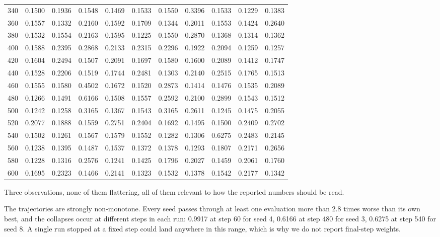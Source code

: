 \begin{table}[htbp]
\begin{tabular}{@{}lcccccccccc@{}}
340 & 0.1500 & 0.1936 & 0.1548 & 0.1469 & 0.1533 & 0.1550 & 0.3396 & 0.1533 & 0.1229 & 0.1383 \\
360 & 0.1557 & 0.1332 & 0.2160 & 0.1592 & 0.1709 & 0.1344 & 0.2011 & 0.1553 & 0.1424 & 0.2640 \\
380 & 0.1532 & 0.1554 & 0.2163 & 0.1595 & 0.1225 & 0.1550 & 0.2870 & 0.1368 & 0.1314 & 0.1362 \\
400 & 0.1588 & 0.2395 & 0.2868 & 0.2133 & 0.2315 & 0.2296 & 0.1922 & 0.2094 & 0.1259 & 0.1257 \\
420 & 0.1604 & 0.2494 & 0.1507 & 0.2091 & 0.1697 & 0.1580 & 0.1600 & 0.2089 & 0.1412 & 0.1747 \\
440 & 0.1528 & 0.2206 & 0.1519 & 0.1744 & 0.2481 & 0.1303 & 0.2140 & 0.2515 & 0.1765 & 0.1513 \\
460 & 0.1555 & 0.1580 & 0.4502 & 0.1672 & 0.1520 & 0.2873 & 0.1414 & 0.1476 & 0.1535 & 0.2089 \\
480 & 0.1266 & 0.1491 & 0.6166 & 0.1508 & 0.1557 & 0.2592 & 0.2100 & 0.2899 & 0.1543 & 0.1512 \\
500 & 0.1242 & 0.1258 & 0.3165 & 0.1367 & 0.1543 & 0.3165 & 0.2611 & 0.1245 & 0.1475 & 0.2055 \\
520 & 0.2077 & 0.1888 & 0.1559 & 0.2751 & 0.2404 & 0.1692 & 0.1495 & 0.1500 & 0.2409 & 0.2702 \\
540 & 0.1502 & 0.1261 & 0.1567 & 0.1579 & 0.1552 & 0.1282 & 0.1306 & 0.6275 & 0.2483 & 0.2145 \\
560 & 0.1238 & 0.1395 & 0.1487 & 0.1537 & 0.1372 & 0.1378 & 0.1293 & 0.1807 & 0.2171 & 0.2656 \\
580 & 0.1228 & 0.1316 & 0.2576 & 0.1241 & 0.1425 & 0.1796 & 0.2027 & 0.1459 & 0.2061 & 0.1760 \\
600 & 0.1695 & 0.2323 & 0.1466 & 0.2141 & 0.1323 & 0.1532 & 0.1378 & 0.1542 & 0.2177 & 0.1342 \\
\bottomrule
\end{tabular}
\end{table}

Three observations, none of them flattering, all of them relevant to how the
reported numbers should be read.

The trajectories are strongly non-monotone. Every seed passes through at least
one evaluation more than 2.8 times worse than its own best, and the collapses
occur at different steps in each run: 0.9917 at step 60 for seed 4, 0.6166 at
step 480 for seed 3, 0.6275 at step 540 for seed 8. A single run stopped at a
fixed step could land anywhere in this range, which is why we do not report
final-step weights.

